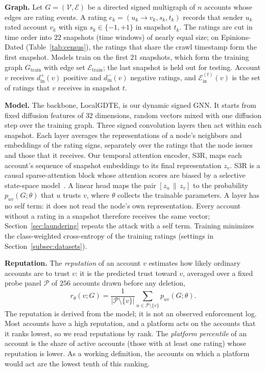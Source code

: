 \documentclass[lettersize,journal]{IEEEtran}
\begin{document}
\smallskip\noindent\textbf{Graph.}
Let $G = (\mathcal{V}, \mathcal{E})$ be a directed signed multigraph of $n$ accounts whose edges are rating events.
A rating $e_k = (u_k \to v_k, s_k, t_k)$ records that sender $u_k$ rated account $v_k$ with sign $s_k \in \{-1, +1\}$ in snapshot $t_k$.
The ratings are cut in time order into $22$ snapshots (time windows) of nearly equal size; on Epinions-Dated (Table~\ref{tab:census}), the ratings that share the crawl timestamp form the first snapshot.
Models train on the first $21$ snapshots, which form the training graph $G_{\mathrm{train}}$ with edge set $\mathcal{E}_{\mathrm{train}}$; the last snapshot is held out for testing.
Account $v$ receives $d^+_{\mathrm{in}}(v)$ positive and $d^-_{\mathrm{in}}(v)$ negative ratings, and $\mathcal{E}^{(t)}_{\mathrm{in}}(v)$ is the set of ratings that $v$ receives in snapshot $t$.

\smallskip\noindent\textbf{Model.}
The backbone, LocalGDTE, is our dynamic signed GNN.
It starts from fixed diffusion features of $32$ dimensions, random vectors mixed with one diffusion step over the training graph. Three signed convolution layers then act within each snapshot. Each layer averages the representations of a node's neighbors and embeddings of the rating signs, separately over the ratings that the node issues and those that it receives.
Our temporal attention encoder, S3R, maps each account's sequence of snapshot embeddings to its final representation $z_v$. S3R is a causal sparse-attention block whose attention scores are biased by a selective state-space model~\cite{gu2023mamba}. A linear head maps the pair $[z_u \,\|\, z_v]$ to the probability $p_{uv}(G; \theta)$ that $u$ trusts $v$, where $\theta$ collects the trainable parameters.
A layer has no self term: it does not read the node's own representation. Every account without a rating in a snapshot therefore receives the same vector; Section~\ref{sec:laundering} repeats the attack with a self term.
Training minimizes the class-weighted cross-entropy of the training ratings (settings in Section~\ref{subsec:datasets}).

\smallskip\noindent\textbf{Reputation.}
The \emph{reputation} of an account $v$ estimates how likely ordinary accounts are to trust $v$: it is the predicted trust toward $v$, averaged over a fixed probe panel $\mathcal{P}$ of $256$ accounts drawn before any deletion,
\begin{equation}
\label{eq:canonical_rep}
r_\theta(v; G) = \frac{1}{|\mathcal{P} \setminus \{v\}|} \sum_{u \in \mathcal{P} \setminus \{v\}} p_{uv}(G; \theta).
\end{equation}
The reputation is derived from the model; it is not an observed enforcement log.
Most accounts have a high reputation, and a platform acts on the accounts that it ranks lowest, so we read reputations by rank. The \emph{platform percentile} of an account is the share of active accounts (those with at least one rating) whose reputation is lower.
As a working definition, the accounts on which a platform would act are the lowest tenth of this ranking.
\end{document}
